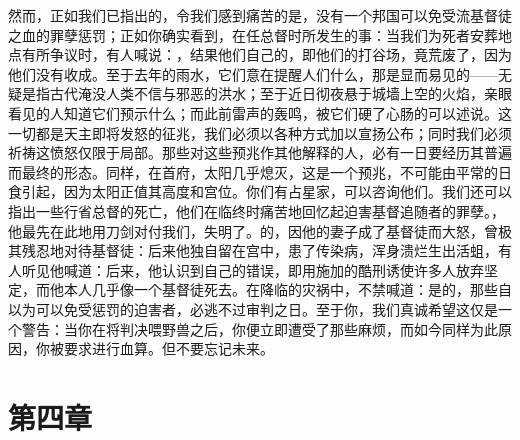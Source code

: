 然而，正如我们已指出的，令我们感到痛苦的是，没有一个邦国可以免受流基督徒之血的罪孽惩罚；正如你确实看到，在任总督时所发生的事：当我们为死者安葬地点有所争议时，有人喊说：，结果他们自己的，即他们的打谷场，竟荒废了，因为他们没有收成。至于去年的雨水，它们意在提醒人们什么，那是显而易见的——无疑是指古代淹没人类不信与邪恶的洪水；至于近日彻夜悬于城墙上空的火焰，亲眼看见的人知道它们预示什么；而此前雷声的轰鸣，被它们硬了心肠的可以述说。这一切都是天主即将发怒的征兆，我们必须以各种方式加以宣扬公布；同时我们必须祈祷这愤怒仅限于局部。那些对这些预兆作其他解释的人，必有一日要经历其普遍而最终的形态。同样，在首府，太阳几乎熄灭，这是一个预兆，不可能由平常的日食引起，因为太阳正值其高度和宫位。你们有占星家，可以咨询他们。我们还可以指出一些行省总督的死亡，他们在临终时痛苦地回忆起迫害基督追随者的罪孽。，他最先在此地用刀剑对付我们，失明了。的，因他的妻子成了基督徒而大怒，曾极其残忍地对待基督徒：后来他独自留在宫中，患了传染病，浑身溃烂生出活蛆，有人听见他喊道：后来，他认识到自己的错误，即用施加的酷刑诱使许多人放弃坚定，而他本人几乎像一个基督徒死去。在降临的灾祸中，不禁喊道：是的，那些自以为可以免受惩罚的迫害者，必逃不过审判之日。至于你，我们真诚希望这仅是一个警告：当你在将判决喂野兽之后，你便立即遭受了那些麻烦，而如今同样为此原因，你被要求进行血算。但不要忘记未来。\par


\section{第四章}

